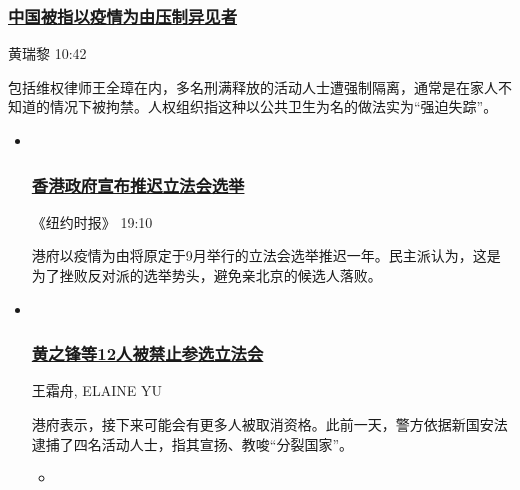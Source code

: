 \hypertarget{ux4e2dux56fdux88abux6307ux4ee5ux75abux60c5ux4e3aux7531ux538bux5236ux5f02ux89c1ux8005}{%
\subsubsection{\texorpdfstring{\href{/china/20200731/coronavirus-china-qurantine/}{中国被指以疫情为由压制异见者}}{中国被指以疫情为由压制异见者}}\label{ux4e2dux56fdux88abux6307ux4ee5ux75abux60c5ux4e3aux7531ux538bux5236ux5f02ux89c1ux8005}}

黄瑞黎 10:42

包括维权律师王全璋在内，多名刑满释放的活动人士遭强制隔离，通常是在家人不知道的情况下被拘禁。人权组织指这种以公共卫生为名的做法实为``强迫失踪''。

\begin{itemize}
\item ~
  \hypertarget{ux9999ux6e2fux653fux5e9cux5ba3ux5e03ux63a8ux8fdfux7acbux6cd5ux4f1aux9009ux4e3e}{%
  \subsubsection{\texorpdfstring{\href{/china/20200731/hong-kong-election-delayed/}{香港政府宣布推迟立法会选举}}{香港政府宣布推迟立法会选举}}\label{ux9999ux6e2fux653fux5e9cux5ba3ux5e03ux63a8ux8fdfux7acbux6cd5ux4f1aux9009ux4e3e}}

  《纽约时报》 19:10

  \href{/china/20200731/hong-kong-election-delayed/}{}

  港府以疫情为由将原定于9月举行的立法会选举推迟一年。民主派认为，这是为了挫败反对派的选举势头，避免亲北京的候选人落败。
\item ~
  \hypertarget{ux9ec4ux4e4bux950bux7b4912ux4ebaux88abux7981ux6b62ux53c2ux9009ux7acbux6cd5ux4f1a}{%
  \subsubsection{\texorpdfstring{\href{/china/20200730/hong-kong-arrests-security-law/}{黄之锋等12人被禁止参选立法会}}{黄之锋等12人被禁止参选立法会}}\label{ux9ec4ux4e4bux950bux7b4912ux4ebaux88abux7981ux6b62ux53c2ux9009ux7acbux6cd5ux4f1a}}

  王霜舟, ELAINE YU

  \href{/china/20200730/hong-kong-arrests-security-law/}{}

  港府表示，接下来可能会有更多人被取消资格。此前一天，警方依据新国安法逮捕了四名活动人士，指其宣扬、教唆``分裂国家''。

  \begin{itemize}
  \item ~
    \hypertarget{ux4e13ux9898ux9999ux6e2fux56fdux5b89ux6cd5}{%
}
\end{itemize}
\end{itemize}
